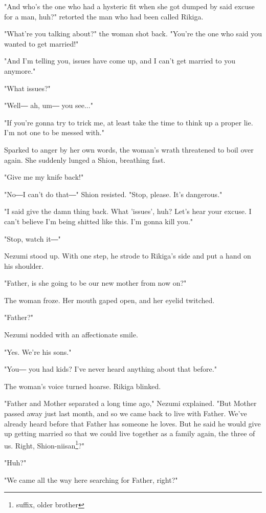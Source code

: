 "And who's the one who had a hysteric fit when she got dumped by said
excuse for a man, huh?" retorted the man who had been called Rikiga.

"What're you talking about?" the woman shot back. "You're the one who
said you wanted to get married!"

"And I'm telling you, issues have come up, and I can't get married to
you anymore."

"What issues?"

"Well― ah, um― you see..."

"If you're gonna try to trick me, at least take the time to think up a
proper lie. I'm not one to be messed with."

Sparked to anger by her own words, the woman's wrath threatened to boil
over again. She suddenly lunged a Shion, breathing fast.

"Give me my knife back!"

"No―I can't do that―" Shion resisted. "Stop, please. It's dangerous."

"I said give the damn thing back. What 'issues', huh? Let's hear your
excuse. I can't believe I'm being shitted like this. I'm gonna kill
you."

"Stop, watch it―"

Nezumi stood up. With one step, he strode to Rikiga's side and put a
hand on his shoulder.

"Father, is she going to be our new mother from now on?"

The woman froze. Her mouth gaped open, and her eyelid twitched.

"Father?"

Nezumi nodded with an affectionate smile.

"Yes. We're his sons."

"You― you had kids? I've never heard anything about that before."

The woman's voice turned hoarse. Rikiga blinked.

"Father and Mother separated a long time ago," Nezumi explained. "But
Mother passed away just last month, and so we came back to live with
Father. We've already heard before that Father has someone he loves. But
he said he would give up getting married so that we could live together
as a family again, the three of us. Right, Shion-niisan\footnote{suffix, older brother}?"

"Huh?"

"We came all the way here searching for Father, right?"

